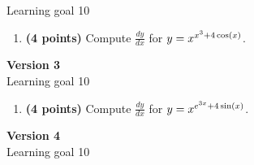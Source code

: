 \documentclass[12pt]{amsart}
\begin{document}
Learning goal 10
\begin{enumerate}[resume]
\item {\bf (4 points)} 
 Compute $\frac{dy}{dx}$ for $y=x^{x^3 +4 \cos(x)}$.

\vfill 
 \end{enumerate}$ $ \\ {\bf Version 3} \\ 
Learning goal 10
\begin{enumerate}[resume]
\item {\bf (4 points)} 
 Compute $\frac{dy}{dx}$ for $y=x^{e^{3 x} +4 \sin(x)}$.

\vfill 
 \end{enumerate}$ $ \\ {\bf Version 4} \\ 
Learning goal 10
\end{document}
